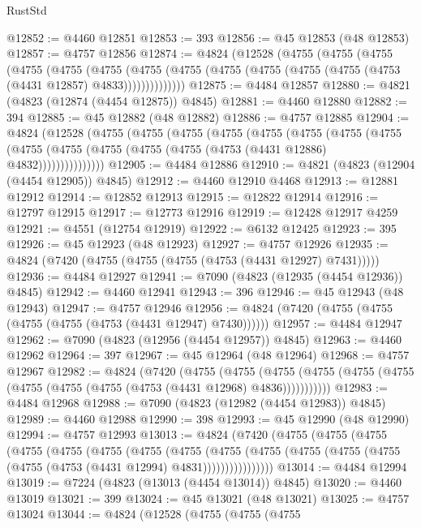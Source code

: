 \begin{lexlean}{RustStd}
\begin{coremodule}
@12852 := @4460 @12851
@12853 := 393
@12856 := @45 @12853 (@48 @12853)
@12857 := @4757 @12856
@12874 := @4824
    (@12528
      (@4755
        (@4755
          (@4755
            (@4755
              (@4755
                (@4755
                  (@4755
                    (@4755 (@4755 (@4755 (@4755 (@4755 (@4753 (@4431 @12857) @4833))))))))))))))
@12875 := @4484 @12857
@12880 := @4821 (@4823 (@12874 (@4454 @12875)) @4845)
@12881 := @4460 @12880
@12882 := 394
@12885 := @45 @12882 (@48 @12882)
@12886 := @4757 @12885
@12904 := @4824
    (@12528
      (@4755
        (@4755
          (@4755
            (@4755
              (@4755
                (@4755
                  (@4755
                    (@4755
                      (@4755 (@4755 (@4755 (@4755 (@4755 (@4753 (@4431 @12886) @4832)))))))))))))))
@12905 := @4484 @12886
@12910 := @4821 (@4823 (@12904 (@4454 @12905)) @4845)
@12912 := @4460 @12910 @4468
@12913 := @12881 @12912
@12914 := @12852 @12913
@12915 := @12822 @12914
@12916 := @12797 @12915
@12917 := @12773 @12916
@12919 := @12428 @12917 @4259
@12921 := @4551 (@12754 @12919)
@12922 := @6132 @12425
@12923 := 395
@12926 := @45 @12923 (@48 @12923)
@12927 := @4757 @12926
@12935 := @4824 (@7420 (@4755 (@4755 (@4755 (@4753 (@4431 @12927) @7431)))))
@12936 := @4484 @12927
@12941 := @7090 (@4823 (@12935 (@4454 @12936)) @4845)
@12942 := @4460 @12941
@12943 := 396
@12946 := @45 @12943 (@48 @12943)
@12947 := @4757 @12946
@12956 := @4824 (@7420 (@4755 (@4755 (@4755 (@4755 (@4753 (@4431 @12947) @7430))))))
@12957 := @4484 @12947
@12962 := @7090 (@4823 (@12956 (@4454 @12957)) @4845)
@12963 := @4460 @12962
@12964 := 397
@12967 := @45 @12964 (@48 @12964)
@12968 := @4757 @12967
@12982 := @4824
    (@7420
      (@4755
        (@4755
          (@4755 (@4755 (@4755 (@4755 (@4755 (@4755 (@4755 (@4753 (@4431 @12968) @4836)))))))))))
@12983 := @4484 @12968
@12988 := @7090 (@4823 (@12982 (@4454 @12983)) @4845)
@12989 := @4460 @12988
@12990 := 398
@12993 := @45 @12990 (@48 @12990)
@12994 := @4757 @12993
@13013 := @4824
    (@7420
      (@4755
        (@4755
          (@4755
            (@4755
              (@4755
                (@4755
                  (@4755
                    (@4755
                      (@4755
                        (@4755
                          (@4755 (@4755 (@4755 (@4755 (@4753 (@4431 @12994) @4831))))))))))))))))
@13014 := @4484 @12994
@13019 := @7224 (@4823 (@13013 (@4454 @13014)) @4845)
@13020 := @4460 @13019
@13021 := 399
@13024 := @45 @13021 (@48 @13021)
@13025 := @4757 @13024
@13044 := @4824
    (@12528
      (@4755
        (@4755
          (@4755

\end{coremodule}
\end{lexlean}
